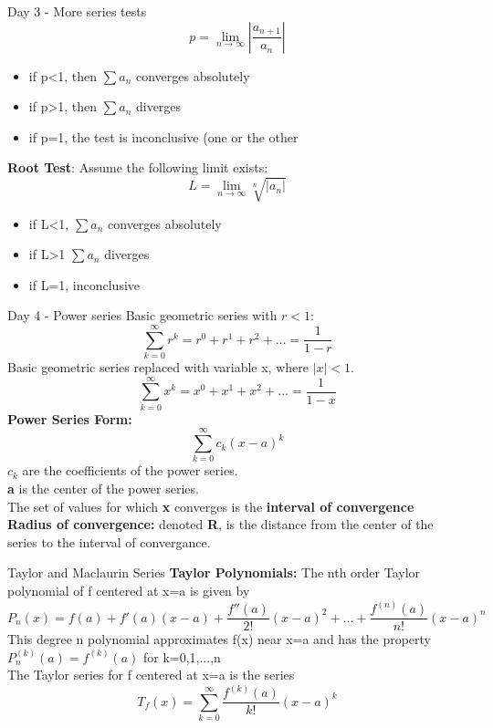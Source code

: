 \documentclass[a4paper, 12pt]{article}
\begin{document}
\begin{section}{Day 3 - More series tests}
\begin{equation}
p=\lim\limits_{n\to\infty}|\frac{a_{n+1}}{a_{n}}|
\end{equation}
\begin{itemize}
\item{if p<1, then $\sum a_{n}$ converges absolutely}
\item{if p>1, then $\sum a_{n}$ diverges}
\item{if p=1, the test is inconclusive (one or the other}
\end{itemize}
\textbf{Root Test}: Assume the following limit exists:
\begin{equation} 
L=\lim\limits_{n\to\infty}\sqrt[n]{|a_{n}|}
\end{equation}
\begin{itemize}
\item{if L<1, $\sum a_{n}$ converges absolutely}
\item{if L>1 $\sum a_{n}$ diverges}
\item{if L=1, inconclusive}

\end{itemize}

\end{section}
\begin{section}{Day 4 - Power series}	
Basic geometric series with $r<1$: 
\begin{equation}
\sum_{k=0}^{\infty}r^{k}=r^{0}+r^{1}+r^{2}+\dots=\frac{1}{1-r}
\end{equation}
Basic geometric series replaced with variable x, where $|x|<1$.
\begin{equation}
\sum_{k=0}^{\infty}x^{k}=x^{0}+x^{1}+x^{2}+\dots=\frac{1}{1-x}
\end{equation}
\textbf{Power Series Form:}
\begin{equation} 
\sum_{k=0}^{\infty}c_{k}(x-a)^{k}
\end{equation}
$c_{k}$ are the coefficients of the power series.\\
\textbf{a} is the center of the power series.\\
The set of values for which \textbf{x} converges is the 
\textbf{interval of convergence}\\
\textbf{Radius of convergence:} denoted \textbf{R}, is the distance from the
center of the series to the interval of convergance.

\end{section}
\begin{section}{Taylor and Maclaurin Series}
\textbf{Taylor Polynomials:} The nth order Taylor polynomial of f centered at x=a is given by
\begin{equation}
	P_{n}(x)=f(a)+f'(a)(x-a)+\frac{f''(a)}{2!}(x-a)^{2}+\dots+\frac{f^{(n)}(a)}{n!}(x-a)^{n}
\end{equation}
This degree n polynomial approximates f(x) near x=a and has the property $P^{(k)}_{n}(a)=f^{(k)}(a)
$ for k=0,1,...,n\\
The Taylor series for f centered at x=a is the series 
\begin{equation}
	T_{f}(x)=\sum_{k=0}^{\infty}\frac{f^{(k)}(a)}{k!}(x-a)^{k}
\end{equation}
\end{section}
\end{document}
